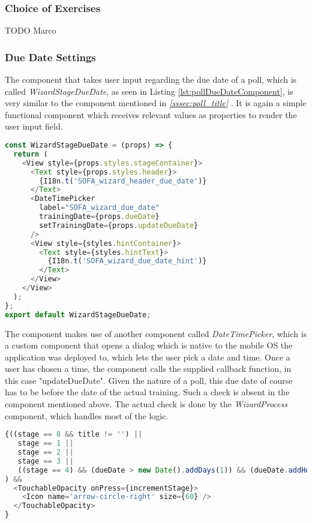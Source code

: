 \subsubsection{Choice of Exercises}
\label{sssec:poll_exercises}

TODO Marco

\subsubsection{Due Date Settings}
\label{sssec:poll_due_date}

The component that takes user input regarding the due date of a poll, which is called \textit{WizardStageDueDate}, as seen in Listing \ref{lst:pollDueDateComponent}, is very similar to the component mentioned in \textit{\ref{sssec:poll_title} }. It is again a simple functional component which receives relevant values as properties to render the user input field.

\begin{lstlisting}[language=javascript,caption=Simplified Poll Due Date Component,label=lst:pollDueDateComponent]
const WizardStageDueDate = (props) => {
  return (
    <View style={props.styles.stageContainer}>
      <Text style={props.styles.header}>
        {I18n.t('SOFA_wizard_header_due_date')}
      </Text>
      <DateTimePicker
        label="SOFA_wizard_due_date"
        trainingDate={props.dueDate}
        setTrainingDate={props.updateDueDate}
      />
      <View style={styles.hintContainer}>
        <Text style={styles.hintText}>
          {I18n.t('SOFA_wizard_due_date_hint')}
        </Text>
      </View>
    </View>
  );
};
export default WizardStageDueDate;
\end{lstlisting}

The component makes use of another component called \textit{DateTimePicker}, which is a custom component that opens a dialog which is native to the mobile OS the application was deployed to, which lets the user pick a date and time. Once a user has chosen a time, the component calls the supplied callback function, in this case "updateDueDate".
\newline
Given the nature of a poll, this due date of course has to be before the date of the actual training. Such a check is absent in the component mentioned above. The actual check is done by the \textit{WizardProcess} component, which handles most of the logic.

\begin{lstlisting}[language=javascript,caption=Increment Stage Check,label=lst:incrementStageCheck]
{((stage == 0 && title != '') ||
   stage == 1 ||
   stage == 2 ||
   stage == 3 ||
   ((stage == 4) && (dueDate > new Date().addDays(1)) && (dueDate.addHours(2) < trainingDate))
) &&
  <TouchableOpacity onPress={incrementStage}>
    <Icon name='arrow-circle-right' size={60} />
  </TouchableOpacity>
}
\end{lstlisting}

